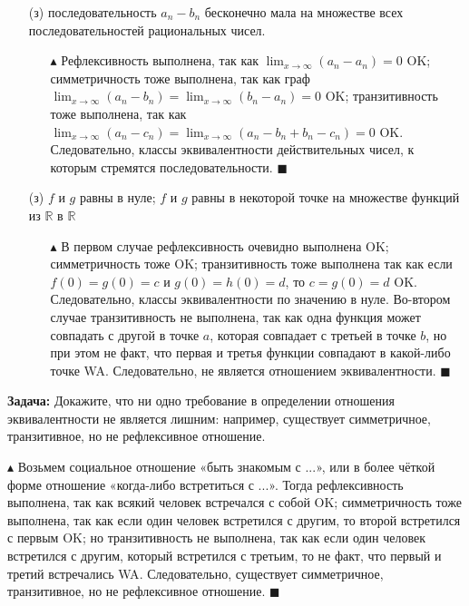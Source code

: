 \begin{enumerate}
    \item[(з)] последовательность $a_n - b_n$ бесконечно мала на множестве всех последовательностей рациональных чисел.
    \begin{itemize}
        \item[$\blacktriangle$] Рефлексивность выполнена, так как $\lim_{x\to\infty} (a_n-a_n) = 0$ {\color{ForestGreen}OK}; симметричность тоже выполнена, так как граф $\lim_{x\to\infty} (a_n-b_n) = \lim_{x\to\infty} (b_n-a_n) =0$ {\color{ForestGreen}OK}; транзитивность тоже выполнена, так как $\lim_{x\to\infty} (a_n-c_n) = \lim_{x\to\infty} (a_n-b_n+b_n-c_n) =0$ {\color{ForestGreen}OK}. Следовательно, классы эквивалентности действительных чисел, к которым стремятся последовательности. $\blacksquare$
    \end{itemize}
    
    \item[(з)] $f$ и $g$ равны в нуле; $f$ и $g$ равны в некоторой точке на множестве функций из $\mathbb{R}$ в $\mathbb{R}$
    \begin{itemize}
        \item[$\blacktriangle$] В первом случае рефлексивность очевидно выполнена {\color{ForestGreen}OK}; симметричность тоже {\color{ForestGreen}OK}; транзитивность тоже выполнена так как если $f(0)=g(0)=c$ и $g(0)=h(0)=d$, то $c=g(0)=d$ {\color{ForestGreen}OK}. Следовательно, классы эквивалентности по значению в нуле. 
        \newline Во-втором случае транзитивность не выполнена, так как одна функция может совпадать с другой в точке $a$, которая совпадает с третьей в точке $b$, но при этом не факт, что первая и третья функции совпадают в какой-либо точке {\color{Red}WA}. Следовательно, не является отношением эквивалентности. $\blacksquare$
    \end{itemize}
\end{enumerate}
\par \textbf{Задача:} Докажите, что ни одно требование в определении отношения эквивалентности не является лишним: например, существует симметричное, транзитивное, но не рефлексивное отношение.
\par $\blacktriangle$ Возьмем социальное отношение «быть знакомым с ...», или в более чёткой форме отношение «когда-либо встретиться с ...». Тогда рефлексивность выполнена, так как всякий человек встречался с собой {\color{ForestGreen}OK}; симметричность тоже выполнена, так как если один человек встретился с другим, то второй встретился с первым {\color{ForestGreen}OK}; но транзитивность не выполнена, так как  если один человек встретился с другим, который встретился с третьим, то не факт, что первый и третий встречались {\color{Red}WA}. Следовательно, существует симметричное, транзитивное, но не рефлексивное отношение. $\blacksquare$

